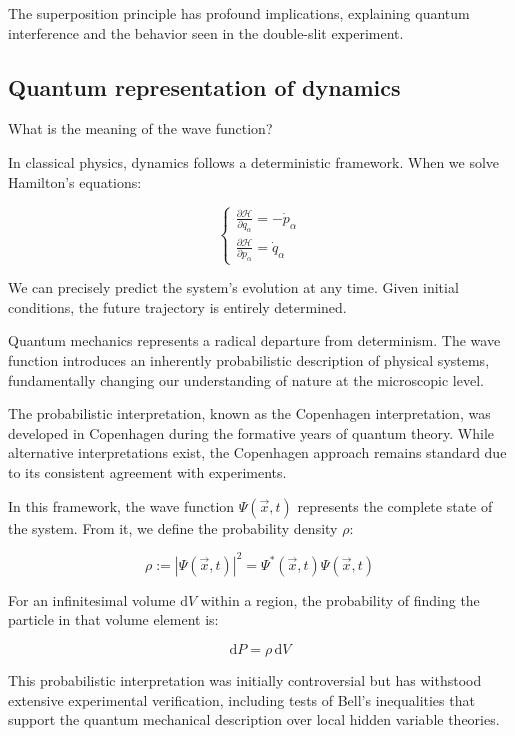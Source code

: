 \documentclass[italian]{HKNdocument}
\begin{document}
The superposition principle has profound implications, explaining quantum interference and the behavior seen in the double-slit experiment.

\subsection{Quantum representation of dynamics}
What is the meaning of the wave function?

In classical physics, dynamics follows a deterministic framework. When we solve Hamilton's equations:

\[
\left\{\begin{array}{l}
\frac{\partial \mathcal{H}}{\partial q_{\alpha}}=-\dot{p}_{\alpha}  \\
\frac{\partial \mathcal{H}}{\partial p_{\alpha}}=\dot{q}_{\alpha}
\end{array}\right.
\]

We can precisely predict the system's evolution at any time. Given initial conditions, the future trajectory is entirely determined.

Quantum mechanics represents a radical departure from determinism. The wave function introduces an inherently probabilistic description of physical systems, fundamentally changing our understanding of nature at the microscopic level.

The probabilistic interpretation, known as the Copenhagen interpretation, was developed in Copenhagen during the formative years of quantum theory. While alternative interpretations exist, the Copenhagen approach remains standard due to its consistent agreement with experiments.

In this framework, the wave function $\Psi(\vec{x}, t)$ represents the complete state of the system. From it, we define the probability density $\rho$:

\begin{equation}
\rho:=|\Psi(\vec{x}, t)|^{2} = \Psi^*(\vec{x}, t)\Psi(\vec{x}, t)
\end{equation}

For an infinitesimal volume $\mathrm{d}V$ within a region, the probability of finding the particle in that volume element is:

\begin{equation}
\mathrm{d}P=\rho\,\mathrm{d}V
\end{equation}

This probabilistic interpretation was initially controversial but has withstood extensive experimental verification, including tests of Bell's inequalities that support the quantum mechanical description over local hidden variable theories.
\end{document}
